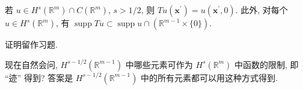 \begin{Lemma}
\label{lem:continuous-function-trace-and-support}
若 $u\in H^s(\mathbb{R}^m)\cap C(\mathbb{R}^m)$, $s>1/2$, 则 $Tu(\bm{x}^{\prime})=u(\bm{x}^{\prime},0)$. 此外, 对每个 $u\in H^s(\mathbb{R}^m)$, 有 $\operatorname{supp}Tu\subset\operatorname{supp}u\cap(\mathbb{R}^{m-1}\times\{0\})$.
\end{Lemma}

证明留作习题.

现在自然会问, $H^{s-1/2}(\mathbb{R}^{m-1})$ 中哪些元素可作为 $H^s(\mathbb{R}^m)$ 中函数的限制, 即 ``迹'' 得到? 答案是 $H^{s-1/2}(\mathbb{R}^{m-1})$ 中的所有元素都可以用这种方式得到.
